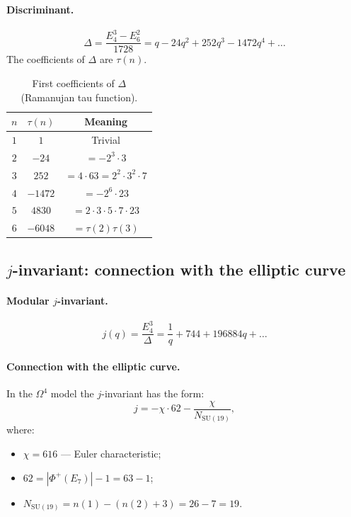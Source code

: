 \documentclass[11pt,a4paper]{article}
\newcommand{\SU}{\mathrm{SU}}
\newcommand{\Om}{\Omega^4}
\theoremstyle{definition}
\begin{document}
\paragraph{Discriminant.}
\begin{equation}
    \Delta = \frac{E_4^3 - E_6^2}{1728} 
    = q - 24 q^2 + 252 q^3 - 1472 q^4 + \ldots
\end{equation}
The coefficients of $\Delta$ are $\tau(n)$.

\begin{table}[htbp]
\centering
\caption{First coefficients of $\Delta$ (Ramanujan tau function).}
\label{tab:modular-tau}
\begin{tabular}{ccc}
\toprule
$n$ & $\tau(n)$ & Meaning \\ 
\midrule
$1$ & $1$ & Trivial \\[0.3em]
$2$ & $-24$ & $= -2^3 \cdot 3$ \\[0.3em]
$3$ & $252$ & $= 4 \cdot 63 = 2^2 \cdot 3^2 \cdot 7$ \\[0.3em]
$4$ & $-1472$ & $= -2^6 \cdot 23$ \\[0.3em]
$5$ & $4830$ & $= 2 \cdot 3 \cdot 5 \cdot 7 \cdot 23$ \\[0.3em]
$6$ & $-6048$ & $= \tau(2)\tau(3)$ \\ 
\bottomrule
\end{tabular}
\end{table}

\subsection{$j$-invariant: connection with the elliptic curve}
\label{subsec:j-invariant-modular}

\paragraph{Modular $j$-invariant.}
\begin{equation}
    j(q) = \frac{E_4^3}{\Delta} = \frac{1}{q} + 744 + 196884 q + \ldots
\end{equation}

\paragraph{Connection with the elliptic curve.}
In the $\Om$ model the $j$-invariant has the form:
\begin{equation}
    \boxed{
    j = -\chi \cdot 62 - \frac{\chi}{N_{\SU(19)}},
    }
    \label{eq:j-invariant-model}
\end{equation}
where:
\begin{itemize}
    \item $\chi = 616$ — Euler characteristic;
    \item $62 = |\Phi^+(E_7)| - 1 = 63 - 1$;
    \item $N_{\SU(19)} = n(1) - (n(2) + 3) = 26 - 7 = 19$.
\end{itemize}
\end{document}

